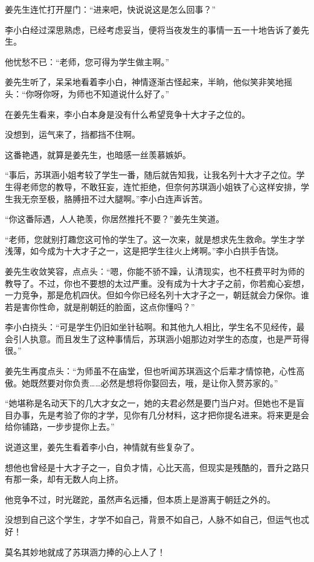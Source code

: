 \begin{this_body}
姜先生连忙打开屋门：“进来吧，快说说这是怎么回事？”

李小白经过深思熟虑，已经考虑妥当，便将当夜发生的事情一五一十地告诉了姜先生。

他忧愁不已：“老师，您可得为学生做主啊。”

姜先生听了，呆呆地看着李小白，神情逐渐古怪起来，半晌，他似笑非笑地摇头：“你呀你呀，为师也不知道说什么好了。”

在姜先生看来，李小白本身是没有什么希望竞争十大才子之位的。

没想到，运气来了，挡都挡不住啊。

这番艳遇，就算是姜先生，也暗感一丝羡慕嫉妒。

“事后，苏琪涵小姐考较了学生一番，随后就告知我，让我名列十大才子之位。学生得老师您的教导，不敢狂妄，连忙拒绝，但奈何苏琪涵小姐铁了心这样安排，学生我无奈至极，胳膊扭不过大腿啊。”李小白连声诉苦。

“你这番际遇，人人艳羡，你居然推托不要？”姜先生笑道。

“老师，您就别打趣您这可怜的学生了。这一次来，就是想求先生救命。学生才学浅薄，如今成为十大才子之一，这是把学生往火上烤啊。”李小白拱手告饶。

姜先生收敛笑容，点点头：“嗯，你能不骄不躁，认清现实，也不枉费平时为师的教导了。不过，你也不要想的太过严重。没有成为十大才子之前，你若痴心妄想，一力竞争，那是危机四伏。但如今你已经名列十大才子之一，朝廷就会力保你。谁若是害你性命，就是削朝廷的脸面，这点你懂吗？”

李小白挠头：“可是学生仍旧如坐针毡啊。和其他九人相比，学生名不见经传，最会引人执意。而且发生了这种事情后，苏琪涵小姐那边对学生的态度，也是严苛得很。”

姜先生再度点头：“为师虽不在庙堂，但也听闻苏琪涵这个后辈才情惊艳，心性高傲。她既然要对你负责……必然是想将你娶回去，哦，是让你入赘苏家的。”

“她堪称是名动天下的几大才女之一，她的夫君必然是要门当户对。但她也不是盲目办事，先是考验了你的才学，见你有几分材料，这才把你提名进来。将来更是会给你铺路，一步步提你上去。”

说道这里，姜先生看着李小白，神情就有些复杂了。

想他也曾经是十大才子之一，自负才情，心比天高，但现实是残酷的，晋升之路只有那一条，却有无数人向上挤。

他竞争不过，时光蹉跎，虽然声名远播，但本质上是游离于朝廷之外的。

没想到自己这个学生，才学不如自己，背景不如自己，人脉不如自己，但运气也忒好！

莫名其妙地就成了苏琪涵力捧的心上人了！


\end{this_body}
